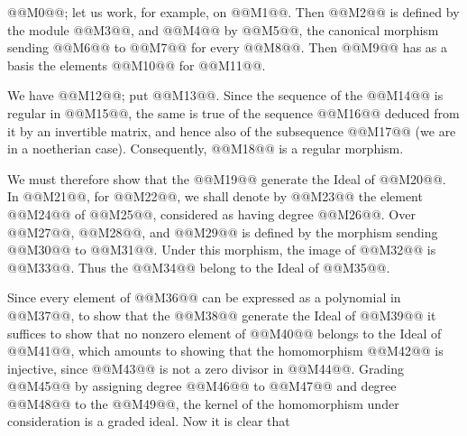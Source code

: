 @@M0@@; let us work, for example, on @@M1@@. Then @@M2@@ is defined by the module @@M3@@, and @@M4@@ by @@M5@@, the canonical morphism sending @@M6@@ to @@M7@@ for every @@M8@@. Then @@M9@@ has as a basis the elements @@M10@@ for @@M11@@.

We have @@M12@@; put @@M13@@.
Since the sequence of the @@M14@@ is regular in @@M15@@, the same is true of the sequence @@M16@@ deduced from it by an invertible matrix, and hence also of the subsequence @@M17@@ (we are in a noetherian case). Consequently, @@M18@@ is a regular morphism.

We must therefore show that the @@M19@@ generate the Ideal of @@M20@@. In @@M21@@, for @@M22@@, we shall denote by @@M23@@ the element @@M24@@ of @@M25@@, considered as having degree @@M26@@. Over @@M27@@, @@M28@@, and @@M29@@ is defined by the morphism sending @@M30@@ to @@M31@@. Under this morphism, the image of @@M32@@ is @@M33@@. Thus the @@M34@@ belong to the Ideal of @@M35@@.

Since every element of @@M36@@ can be expressed as a polynomial in @@M37@@, to show that the @@M38@@ generate the Ideal of @@M39@@ it suffices to show that no nonzero element of @@M40@@ belongs to the Ideal of @@M41@@, which amounts to showing that the homomorphism
@@M42@@
is injective, since @@M43@@ is not a zero divisor in @@M44@@. Grading @@M45@@ by assigning degree @@M46@@ to @@M47@@ and degree @@M48@@ to the @@M49@@, the kernel of the homomorphism under consideration is a graded ideal. Now it is clear that
